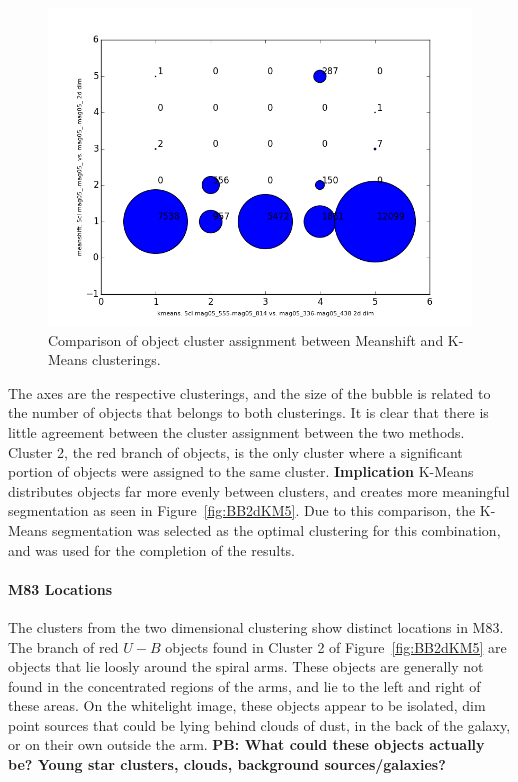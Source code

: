 \begin{figure}[H]
\centering
\includegraphics[width=\linewidth]{figs/broad/kmeans-5cl_mag05_555-mag05_814_vs_meanshift-5cl_mag05_-mag05__mag05_-mag05__2ddim_compare}
\caption{Comparison of object cluster assignment between Meanshift and K-Means clusterings.}
\label{fig:BB2dMSKMcomp}
\end{figure}

The axes are the respective clusterings, and the size of the bubble is related to the number of objects that belongs to both clusterings.
It is clear that there is little agreement between the cluster assignment between the two methods. 
Cluster 2, the red branch of objects, is the only cluster where a significant portion of objects were assigned to the same cluster. \textbf{Implication}
K-Means distributes objects far more evenly between clusters, and creates more meaningful segmentation as seen in Figure~\ref{fig:BB2dKM5}.
Due to this comparison, the K-Means segmentation was selected as the optimal clustering for this combination, and was used for the completion of the results.

\paragraph{M83 Locations}

The clusters from the two dimensional clustering show distinct locations in M83.
The branch of red $U - B$ objects found in Cluster 2 of Figure~\ref{fig:BB2dKM5} are objects that lie loosly around the spiral arms.
These objects are generally not found in the concentrated regions of the arms, and lie to the left and right of these areas.
On the whitelight image, these objects appear to be isolated, dim point sources that could be lying behind clouds of dust, in the back of the galaxy, or on their own outside the arm.
\textbf{PB: What could these objects actually be? Young star clusters, clouds, background sources/galaxies?}

